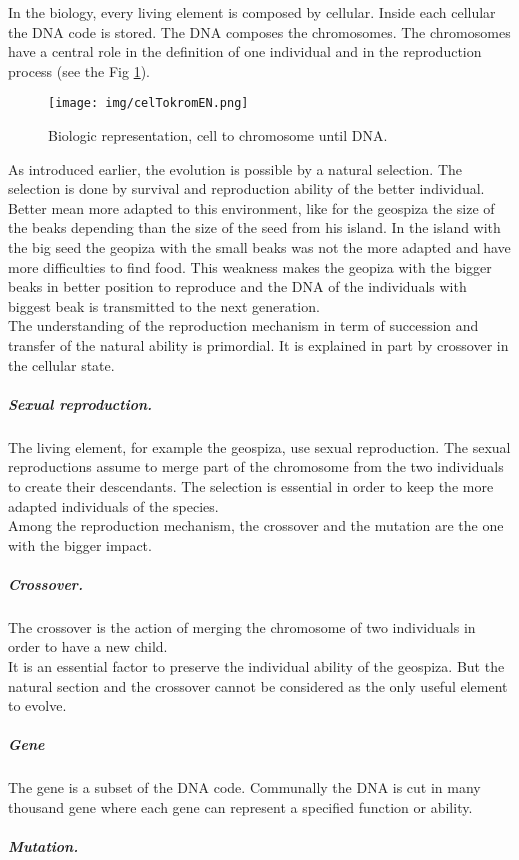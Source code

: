 In the biology, every living element is composed by cellular. Inside each cellular the DNA code is stored. The DNA composes the chromosomes. The chromosomes have a central role in the definition of one individual and in the reproduction process (see the Fig \ref{fig:celTokrom}). \\
\begin{figure}[t!]
\center
{}
   \texttt{[image: img/celTokromEN.png]}
  \caption{Biologic representation, cell to chromosome until DNA.}\label{fig:celTokrom}
  \endminipage\hfill
\end{figure}
As introduced earlier, the evolution is possible by a natural selection. The selection is done by survival and reproduction ability of the better individual. Better mean more adapted to this environment, like for the geospiza the size of the beaks depending than the size of the seed from his island.
In the island with the big seed  the geopiza with the small beaks was not the more adapted and have more difficulties to find food. This weakness makes the geopiza with the bigger beaks in better position to reproduce and
 the DNA of the individuals with biggest beak is transmitted to the next generation.\\
 The understanding of the reproduction mechanism in term of succession and transfer of the natural ability is primordial. It is explained in part by crossover in the cellular state.
 \subparagraph{Sexual reproduction. }
The living element, for example the geospiza, use sexual reproduction. The sexual reproductions assume to merge  part of the chromosome from the two individuals to create their descendants. The selection is essential in order to keep the more adapted individuals of the species. \\ 
Among the reproduction mechanism, the crossover and the mutation are the one with the bigger impact.
\subparagraph{Crossover. }
The crossover is the action of merging the chromosome of two individuals in order to have a new child.\\
It is an essential factor to preserve the individual ability of the geospiza. But the natural section and the crossover cannot be considered as the only useful element to evolve. 
\subparagraph{Gene}
The gene is a subset of the DNA code. Communally the DNA is cut in many thousand gene where each gene can represent a specified function or ability.  
\subparagraph{Mutation. }
